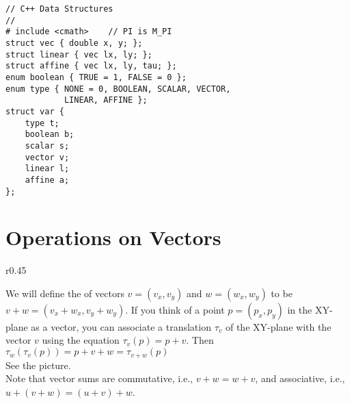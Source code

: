 \documentclass[12pt]{article}
\begin{document}
\bigskip

\hspace*{0.3in}\begin{minipage}{5.0in}
\begin{verbatim}
// C++ Data Structures
//
# include <cmath>    // PI is M_PI
struct vec { double x, y; };
struct linear { vec lx, ly; };
struct affine { vec lx, ly, tau; };
enum boolean { TRUE = 1, FALSE = 0 };
enum type { NONE = 0, BOOLEAN, SCALAR, VECTOR,
            LINEAR, AFFINE };
struct var {
    type t;
    boolean b;
    scalar s;
    vector v;
    linear l;
    affine a;
};
\end{verbatim}
\end{minipage}

\section{Operations on Vectors}
\begin{minipage}{\textwidth}\raggedright
\begin{wrapfigure}{r}{0.45\textwidth}
\end{wrapfigure}
We will define the  of vectors $v=(v_x,v_y)$ and
$w=(w_x,w_y)$ to be $v+w=(v_x+w_x,v_y+w_y)$.  If you
think of a point $p=(p_x,p_y)$ in the XY-plane as a vector,
you can associate a translation $\tau_v$ of the XY-plane
with the vector $v$ using the equation $\tau_v(p)=p+v$.  Then\\
\hspace*{0.2in}$\tau_w(\tau_v(p)) = p+v+w = \tau_{v+w}(p)$ \\
See the picture.
\\[1ex]
Note that vector sums are commutative, i.e.,  $v+w=w+v$, and associative,
i.e., $u+(v+w)=(u+v)+w$.
\end{minipage}
\end{document}
